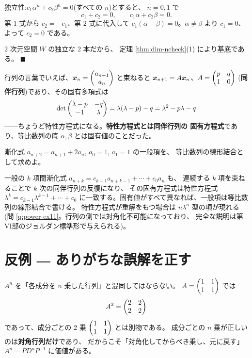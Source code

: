 独立性:$c_1\alpha^n + c_2\beta^n = 0$(すべての $n$)とすると、
$n = 0, 1$ で
\[
c_1 + c_2 = 0, \qquad c_1\alpha + c_2\beta = 0.
\]
第 $1$ 式から $c_2 = -c_1$、第 $2$ 式に代入して
$c_1(\alpha - \beta) = 0$。$\alpha \neq \beta$ より $c_1 = 0$、
よって $c_2 = 0$ である。

$2$ 次元空間 $W$ の独立な $2$ 本だから、
定理 \ref{thm:dim-ncheck}(1) により基底である。 $\blacksquare$

行列の言葉でいえば、$\bm{x}_n = \begin{pmatrix}a_{n+1} \\ a_n\end{pmatrix}$ と束ねると
$\bm{x}_{n+1} = A\bm{x}_n$、$A = \begin{pmatrix}p & q \\ 1 & 0\end{pmatrix}$
(\textbf{同伴行列})であり、その固有多項式は
\[
\det\begin{pmatrix}\lambda - p & -q \\ -1 & \lambda\end{pmatrix}
= \lambda(\lambda - p) - q = \lambda^2 - p\lambda - q
\]
――ちょうど特性方程式になる。\textbf{特性方程式とは同伴行列の
固有方程式}であり、等比数列の底 $\alpha, \beta$ とは固有値のことだった。

\begin{mondai}\label{q:rec}
漸化式 $a_{n+2} = a_{n+1} + 2a_n$, $a_0 = 1$, $a_1 = 1$ の一般項を、
等比数列の線形結合として求めよ。
\end{mondai}

一般の $k$ 項間漸化式
$a_{n+k} = c_{k-1}a_{n+k-1} + \cdots + c_0 a_n$ も、
連続する $k$ 項を束ねることで $k$ 次の同伴行列の反復になり、
その固有方程式は特性方程式 $\lambda^k = c_{k-1}\lambda^{k-1} + \cdots + c_0$
に一致する。固有値がすべて異なれば、一般項は等比数列の線形結合で書ける。
特性方程式が重解をもつ場合は $n\lambda^n$ 型の項が現れる
(問 \ref{q:power-ex11}。行列の側では対角化不可能になっており、
完全な説明は第VI部のジョルダン標準形で与えられる)。

\section{反例 ― ありがちな誤解を正す}

\begin{hanrei}\label{hanrei:power-entrywise}
$A^n$ を「各成分を $n$ 乗した行列」と混同してはならない。
$A = \begin{pmatrix}1 & 1 \\ 1 & 1\end{pmatrix}$ では
\[
A^2 = \begin{pmatrix}2 & 2 \\ 2 & 2\end{pmatrix}
\]
であって、成分ごとの $2$ 乗 $\begin{pmatrix}1 & 1 \\ 1 & 1\end{pmatrix}$ とは別物である。
成分ごとの $n$ 乗が正しいのは\textbf{対角行列だけ}であり、
だからこそ「対角化してからべき乗し、元に戻す」
$A^n = PD^nP^{-1}$ に価値がある。
\end{hanrei}

